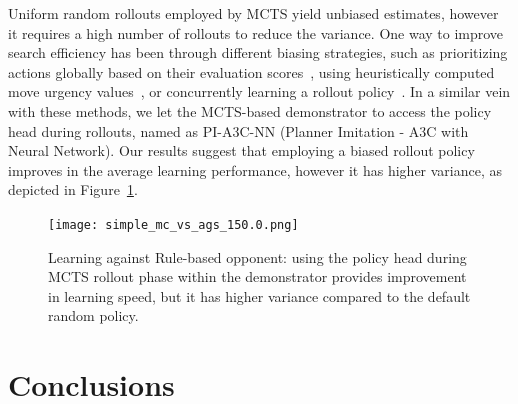 \documentclass[letterpaper]{article}
\begin{document}
\vspace{-1.67mm}
\vspace{-3.34mm}
Uniform random rollouts employed by MCTS yield unbiased estimates, however it requires a high number of rollouts to reduce the variance. One way to improve search efficiency has been through different biasing strategies, such as prioritizing actions globally based on their evaluation scores~\cite{kartal2014user},
using heuristically computed move urgency values~\cite{bouzy2005associating}, or concurrently learning a rollout policy~\cite{ilhan2017monte}. In a similar vein with these methods, we let the MCTS-based demonstrator to access the policy head during rollouts, named as PI-A3C-NN (Planner Imitation - A3C with Neural Network). Our results suggest that employing a biased rollout policy improves in the average learning performance, however it has higher variance, as depicted in Figure~\ref{fig:simple_rollout_biasing}.

\begin{figure}
\centering
\texttt{[image: simple\_mc\_vs\_ags\_150.0.png]}
\caption{Learning against Rule-based opponent: using the policy head during MCTS rollout phase within the demonstrator provides improvement in learning speed, but it has higher variance compared to the default random policy.}
\label{fig:simple_rollout_biasing}
\end{figure}

\vspace{-0.92mm}
\vspace{-1.60mm}
\section{Conclusions}
\end{document}

